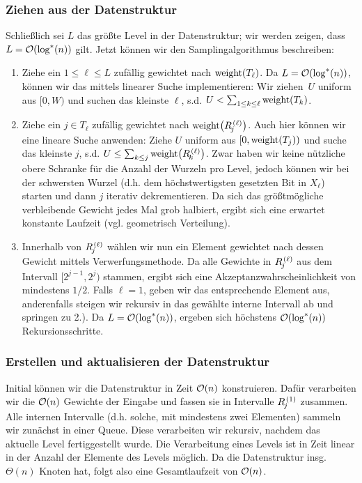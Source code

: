\subsubsection{Ziehen aus der Datenstruktur}
Schließlich sei $L$ das größte Level in der Datenstruktur; wir werden zeigen, dass $L = \mathcal{O}\!\left(\log^* (n)\right)$ gilt.
Jetzt  können wir den Samplingalgorithmus beschreiben:

\begin{enumerate}
    \item Ziehe ein $1 \le \ell \le L$ zufällig gewichtet nach $\operatorname{weight}(T_\ell)$.
          Da $L = \mathcal{O}\!\left(\log^*(n)\right)$, können wir das mittels linearer Suche implementieren:
          Wir ziehen~$U$ uniform aus $[0, W)$ und suchen das kleinste $\ell$, s.d. $U < \sum_{1\le k \le \ell} \operatorname{weight}(T_k)$.

    \item Ziehe ein $j \in T_\ell$ zufällig gewichtet nach $\wrng{\ell}{j}$.
          Auch hier können wir eine lineare Suche anwenden:
          Ziehe $U$ uniform aus $[0, \operatorname{weight}(T_j))$ und suche das kleinste $j$, s.d. $U \le \sum_{k \le j} \wrng{\ell}{k}$.
          Zwar haben wir keine nützliche obere Schranke für die Anzahl der Wurzeln pro Level, jedoch können wir bei der schwersten Wurzel (d.h. dem höchstwertigsten gesetzten Bit in $X_\ell$) starten und dann $j$ iterativ dekrementieren.
          Da sich das größtmögliche verbleibende Gewicht jedes Mal grob halbiert, ergibt sich eine erwartet konstante Laufzeit (vgl. geometrisch Verteilung).

    \item Innerhalb von $\rng{\ell}{j}$ wählen wir nun ein Element gewichtet nach dessen Gewicht mittels Verwerfungsmethode.
          Da alle Gewichte in $\rng{\ell}{j}$ aus dem Intervall $[2^{j-1}, 2^j)$ stammen, ergibt sich eine Akzeptanzwahrscheinlichkeit von mindestens $1/2$.
          Falls $\ell = 1$, geben wir das entsprechende Element aus, anderenfalls steigen wir rekursiv in das gewählte interne Intervall ab und springen zu 2.).
          Da $L = \mathcal{O}\!\left(\log^*(n)\right)$, ergeben sich höchstens $\mathcal{O}\!\left(\log^*(n)\right)$ Rekursionsschritte.
\end{enumerate}

\subsubsection{Erstellen und aktualisieren der Datenstruktur}
Initial können wir die Datenstruktur in Zeit $\mathcal{O}\!\left(n\right)$ konstruieren.
Dafür verarbeiten wir die $\mathcal{O}\!\left(n\right)$ Gewichte der Eingabe und fassen sie in Intervalle $\rng{1}{j}$ zusammen.
Alle internen Intervalle (d.h. solche, mit mindestens zwei Elementen) sammeln wir zunächst in einer Queue.
Diese verarbeiten wir rekursiv, nachdem das aktuelle Level fertiggestellt wurde.
Die Verarbeitung eines Levels ist in Zeit linear in der Anzahl der Elemente des Levels möglich.
Da die Datenstruktur insg. $\Theta(n)$ Knoten hat, folgt also eine Gesamtlaufzeit von $\mathcal{O}\!\left(n\right)$.

